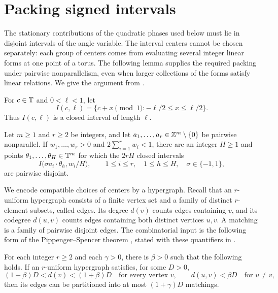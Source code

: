 \section{Packing signed intervals}
\label{sec:packing}

The stationary contributions of the quadratic phases used below must
lie in disjoint intervals of the angle variable.  The interval centers
cannot be chosen separately: each group
of centers comes from evaluating several integer linear forms at one
point of a torus.  The following lemma supplies the required packing
under pairwise nonparallelism, even when larger collections of the forms
satisfy linear relations.  We give the argument from
\cite[Section ``Packing signed intervals'']{OpenAIMinimal}.

For $c\in\mathbb T$ and $0<\ell<1$, let
\[
 I(c,\ell)=\{c+x\pmod 1:-\ell/2\le x\le\ell/2\}.
\]
Thus $I(c,\ell)$ is a closed interval of length $\ell$.

\begin{lemma}
\label{lem:signed-packing}
Let $m\ge1$ and $r\ge2$ be integers, and let
$a_1,\ldots,a_r\in\mathbb Z^m\setminus\{0\}$ be pairwise nonparallel.
If $w_1,\ldots,w_r>0$ and $2\sum_{i=1}^r w_i<1$, there are an integer
$H\ge1$ and points $\theta_1,\ldots,\theta_H\in\mathbb T^m$ for which the
$2rH$ closed intervals
\[
 I\bigl(\sigma a_i\cdot\theta_h,w_i/H\bigr),
 \qquad 1\le i\le r,\quad 1\le h\le H,\quad \sigma\in\{-1,1\},
\]
are pairwise disjoint.
\end{lemma}

We encode compatible choices of centers by a hypergraph.  Recall that
an $r$-uniform hypergraph consists of a finite vertex set and a family
of distinct $r$-element subsets, called edges.  Its degree $d(v)$ counts
edges containing $v$, and its codegree $d(u,v)$ counts edges containing
both distinct vertices $u,v$.  A matching is a family of pairwise
disjoint edges.  The combinatorial input is the following form of the
Pippenger--Spencer theorem \cite{PippengerSpencer1989}, stated with these
quantifiers in \cite[Lemma~2.1]{AlonYuster2005}.

\begin{theorem}
\label{thm:packing-edge-coloring}
For each integer $r\ge2$ and each $\gamma>0$, there is $\beta>0$ such
that the following holds.  If an $r$-uniform hypergraph satisfies, for
some $D>0$,
\[
 (1-\beta)D<d(v)<(1+\beta)D\quad\text{for every vertex }v,
 \qquad d(u,v)<\beta D\quad\text{for }u\ne v,
\]
then its edges can be partitioned into at most $(1+\gamma)D$ matchings.
\end{theorem}

